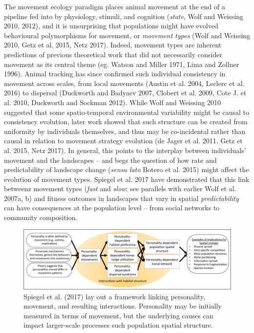 \documentclass[]{scrartcl}
\begin{document}
\begin{linenumbers}
The movement ecology paradigm places animal movement at the end of a
pipeline fed into by physiology, stimuli, and cognition (\emph{state},
Wolf and Weissing 2010, 2012), and it is unsurprising that populations
might have evolved behavioural polymorphisms for movement, or
\emph{movement types} (Wolf and Weissing 2010, Getz et al. 2015, Netz
2017). Indeed, movement types are inherent predictions of previous
theoretical work that did not necessarily consider movement as its
central theme (eg. Watson and Miller 1971, Lima and Zollner 1996).
Animal tracking has since confirmed such individual consistency in
movement across scales, from local movements (Austin et al. 2004,
Leclerc et al. 2016) to dispersal (Duckworth and Badyaev 2007, Clobert
et al. 2009, Cote J. et al. 2010, Duckworth and Sockman 2012). While
Wolf and Weissing 2010 suggested that some spatio-temporal environmental
variability might be causal to consistency evolution, later work showed
that such structure can be created from uniformity by individuals
themselves, and thus may be co-incidental rather than causal in relation
to movement strategy evolution (de Jager et al. 2011, Getz et al. 2015,
Netz 2017). In general, this points to the interplay between
individuals' movement and the landscapes -- and begs the question of how
rate and predictability of landscape change (\emph{sensu lato} Botero et
al. 2015) might affect the evolution of movement types. Spiegel et al.
2017 have demonstrated that this link betweenz movement types
(\emph{fast} and \emph{slow}; see parallels with earlier Wolf et al.
2007a, b) and fitness outcomes in landscapes that vary in spatial
\emph{predictability} can have consequences at the population level --
from social networks to community composition.

\begin{figure}
	\centering
	\includegraphics[width=0.7\linewidth]{fig01_spiegel_etal_2017}
	\caption{Spiegel et al. (2017) lay out a framework linking personality, movement, and resulting interactions. Personality may be initially measured in terms of movement, but the underlying causes can impact larger-scale processes such population spatial structure.}
	\label{fig:fig01spiegeletal2017}
\end{figure}



\end{linenumbers}
\end{document}
